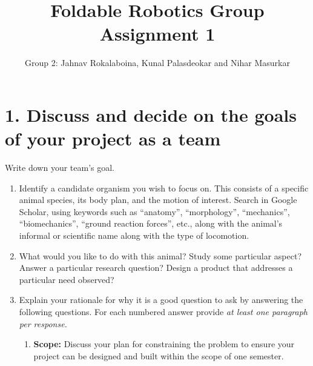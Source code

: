 \documentclass[12pt]{article}
\title{Foldable Robotics Group Assignment 1}
\author{Group 2: Jahnav Rokalaboina, Kunal Palasdeokar and Nihar Masurkar}
\begin{document}
\maketitle

\section*{1. Discuss and decide on the goals of your project as a team}
Write down your team’s goal.
\begin{enumerate}
    \item Identify a candidate organism you wish to focus on. This consists of a specific animal species, its body plan, and the motion of interest. Search in Google Scholar, using keywords such as “anatomy”, “morphology”, “mechanics”, “biomechanics”, “ground reaction forces”, etc., along with the animal’s informal or scientific name along with the type of locomotion.
    
    \item What would you like to do with this animal? Study some particular aspect? Answer a particular research question? Design a product that addresses a particular need observed?
    
    \begin{center}
    \end{center}
    
    \item Explain your rationale for why it is a good question to ask by answering the following questions. For each numbered answer provide \textit{at least one paragraph per response.}
    
    \begin{enumerate}
        \item \textbf{Scope:} Discuss your plan for constraining the problem to ensure your project can be designed and built within the scope of one semester.
        
        \begin{center}
        \end{center}
        

\end{enumerate}
\end{enumerate}
\end{document}
